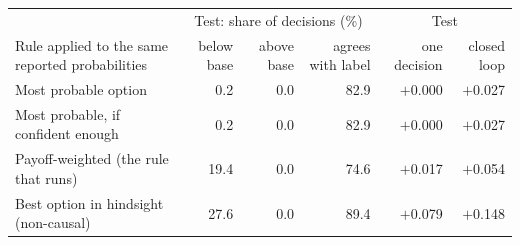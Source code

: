 \begin{tabular}{lrrrrr}
\toprule
 & \multicolumn{3}{c}{Test: share of decisions (\%)} & \multicolumn{2}{c}{Test} \\
Rule applied to the same reported probabilities & below base & above base & agrees with label & one decision & closed loop \\
\midrule
Most probable option & 0.2 & 0.0 & 82.9 & $+$0.000 & $+$0.027 \\
Most probable, if confident enough & 0.2 & 0.0 & 82.9 & $+$0.000 & $+$0.027 \\
Payoff-weighted (the rule that runs) & 19.4 & 0.0 & 74.6 & $+$0.017 & $+$0.054 \\
Best option in hindsight (non-causal) & 27.6 & 0.0 & 89.4 & $+$0.079 & $+$0.148 \\
\bottomrule
\end{tabular}
